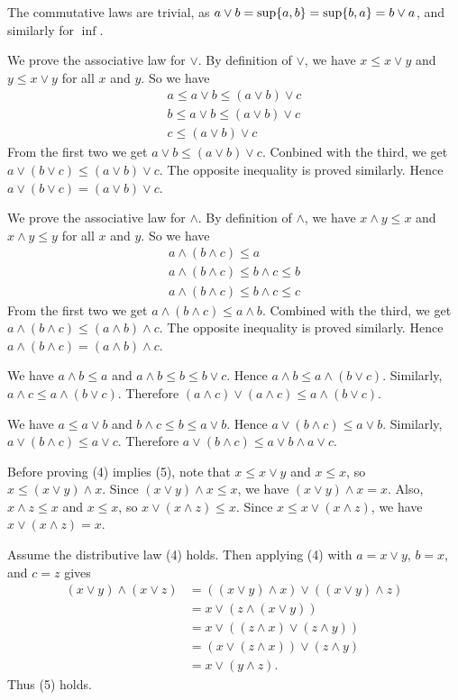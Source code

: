 \begin{solution}
The commutative laws are trivial, as $a\vee b = \sup\set{a,b}=\sup\set{b,a}= b\vee a$,
and similarly for $\inf$.

We prove the associative law for $\vee$. By definition of $\vee$, we have $x\leq x\vee y$ and $y\leq x\vee y$
for all $x$ and $y$.
So we have
\begin{gather*}
    a\leq a\vee b\leq (a\vee b)\vee c\\
    b\leq a\vee b\leq (a\vee b)\vee c\\
    c\leq (a\vee b)\vee c
\end{gather*}
From the first two we get $a\vee b\leq (a\vee b)\vee c$. Conbined with the third, we get
$a\vee (b\vee c) \leq (a\vee b)\vee c$. The opposite inequality is proved similarly.
Hence $a\vee (b\vee c) = (a\vee b)\vee c$.

We prove the associative law for $\wedge$.
By definition of $\wedge$, we have $x\wedge y\leq x$ and $x\wedge y\leq y$
for all $x$ and $y$.
So we have
\begin{gather*}
    a\wedge (b\wedge c) \leq a\\
    a\wedge (b\wedge c) \leq b\wedge c \leq b\\
    a\wedge (b\wedge c) \leq b\wedge c \leq c
\end{gather*}
From the first two we get $a\wedge (b\wedge c)\leq a\wedge b$.
Combined with the third, we get $a\wedge (b\wedge c)\leq (a\wedge b)\wedge c$.
The opposite inequality is proved similarly.
Hence $a\wedge (b\wedge c) = (a\wedge b)\wedge c$.

We have $a\wedge b\leq a$ and $a\wedge b \leq b \leq b\vee c$.
Hence $a\wedge b\leq a\wedge (b\vee c)$. Similarly, $a\wedge c\leq a\wedge (b\vee c)$.
Therefore $(a\wedge c)\vee (a\wedge c)\leq a\wedge (b\vee c)$.

We have $a\leq a\vee b$ and $b\wedge c\leq b\leq a\vee b$. Hence $a\vee (b\wedge c) \leq a\vee b$.
Similarly, $a\vee (b\wedge c) \leq a\vee c$.
Therefore $a\vee (b\wedge c)\leq a\vee b\wedge a\vee c$.

Before proving (4) implies (5), note that $x\leq x\vee y$ and $x\leq x$, so $x\leq (x\vee y)\wedge x$.
Since $(x\vee y)\wedge x\leq x$, we have $(x\vee y)\wedge x = x$.
Also, $x\wedge z\leq x$ and $x\leq x$, so $x\vee (x\wedge z)\leq x$.
Since $x\leq x\vee (x\wedge z)$, we have $x\vee (x\wedge z) = x$.

Assume the distributive law (4) holds. Then applying (4) with $a=x\vee y$, $b=x$, and $c=z$ gives
\[
\begin{aligned}
    (x\vee y)\wedge (x\vee z) &=  ((x\vee y)\wedge x) \vee ((x\vee y)\wedge z)\\
    &= x \vee (z\wedge (x\vee y))\\
    &= x \vee ((z\wedge x)\vee (z\wedge y))\\
    &= (x \vee (z\wedge x)) \vee (z\wedge y)\\
    &= x \vee (y\wedge z).
\end{aligned}
\]
Thus (5) holds.


\end{solution}
